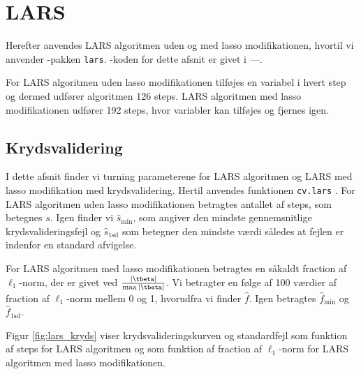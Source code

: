 \section{LARS}
Herefter anvendes LARS algoritmen uden og med lasso modifikationen, hvortil vi anvender \Rlang-pakken \texttt{lars}.
\Rlang-koden for dette afsnit er givet i ---.

For LARS algoritmen uden lasso modifikationen tilføjes en variabel i hvert step og dermed udfører algoritmen 126 steps.
LARS algoritmen med lasso modifikationen udfører 192 steps, hvor variabler kan tilføjes og fjernes igen.

\subsection{Krydsvalidering}
I dette afsnit finder vi turning parameterene for LARS algoritmen og LARS med lasso modifikation med krydsvalidering. 
Hertil anvendes funktionen \texttt{cv.lars} .  
For LARS algoritmen uden lasso modifikationen betragtes antallet af steps, som betegnes \(s\). 
Igen finder vi $\widehat{s}_{\min}$, som angiver den mindste gennemsnitlige krydsvalideringsfejl og $\widehat{s}_{\text{1sd}}$ som betegner den mindste værdi således at fejlen er indenfor en standard afvigelse. 

For LARS algoritmen med lasso modifikationen betragtes en såkaldt fraction af \(\ell_1\)-norm, der er givet ved \(\frac{\vert \tbeta \vert}{\max \vert \tbeta \vert}\).
Vi betragter en følge af 100 værdier af fraction af \(\ell_1\)-norm mellem 0 og 1, hvorudfra vi finder $\widehat{f}$.
Igen betragtes \(\widehat{f}_{\min}\) og \(\widehat{f}_{\text{1sd}}\).



Figur \ref{fig:lars_kryds} viser krydsvalideringskurven og standardfejl som funktion af steps for LARS algoritmen og som funktion af fraction af \(\ell_1\)-norm for LARS algoritmen med lasso modifikationen. 


